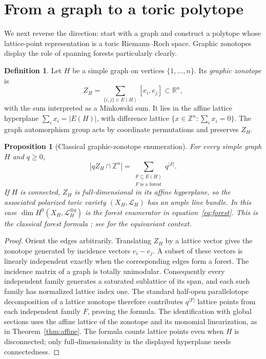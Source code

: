 \documentclass[12pt,letterpaper]{article}
\newtheorem{proposition}[theorem]{Proposition}
\theoremstyle{definition}
\newtheorem{definition}[theorem]{Definition}
\theoremstyle{remark}
\numberwithin{equation}{section}
\newcommand{\ZZ}{\mathbb Z}
\newcommand{\RR}{\mathbb R}
\newcommand{\LL}{\mathcal L}
\begin{document}
\section{From a graph to a toric polytope}\label{sec:zonotope}
We next reverse the direction: start with a graph and construct a polytope whose lattice-point representation is a toric Riemann--Roch space. Graphic zonotopes display the role of spanning forests particularly clearly.

\begin{definition}
Let $H$ be a simple graph on vertices $\{1,\ldots,n\}$. Its \emph{graphic zonotope} is
\begin{equation}\label{eq:zonotope}
Z_H=\sum_{\{i,j\}\in E(H)}[e_i,e_j]\subset\RR^n,
\end{equation}
with the sum interpreted as a Minkowski sum. It lies in the affine lattice hyperplane $\sum_i x_i=|E(H)|$, with difference lattice $\{x\in\ZZ^n:\sum_i x_i=0\}$. The graph automorphism group acts by coordinate permutations and preserves $Z_H$.
\end{definition}

\begin{proposition}[Classical graphic-zonotope enumeration]\label{prop:forests}
For every simple graph $H$ and $q\geq0$,
\begin{equation}\label{eq:forest}
|qZ_H\cap\ZZ^n|=
\sum_{\substack{F\subseteq E(H)\\F\text{ is a forest}}}q^{|F|}.
\end{equation}
If $H$ is connected, $Z_H$ is full-dimensional in its affine hyperplane, so the associated polarized toric variety $(X_H,\LL_H)$ has an ample line bundle. In this case $\dim H^0(X_H,\LL_H^{\otimes q})$ is the forest enumerator in equation~\eqref{eq:forest}. This is the classical forest formula \cite{St91}; see \cite[Section~3.1]{EKS24} for the equivariant context.
\end{proposition}
\begin{proof}
Orient the edges arbitrarily. Translating $Z_H$ by a lattice vector gives the zonotope generated by incidence vectors $e_i-e_j$. A subset of these vectors is linearly independent exactly when the corresponding edges form a forest. The incidence matrix of a graph is totally unimodular. Consequently every independent family generates a saturated sublattice of its span, and each such family has normalized lattice index one. The standard half-open parallelotope decomposition of a lattice zonotope therefore contributes $q^{|F|}$ lattice points from each independent family $F$, proving the formula. The identification with global sections uses the affine lattice of the zonotope and its monomial linearization, as in Theorem~\ref{thm:affine}. The formula counts lattice points even when $H$ is disconnected; only full-dimensionality in the displayed hyperplane needs connectedness.
\end{proof}
\end{document}
